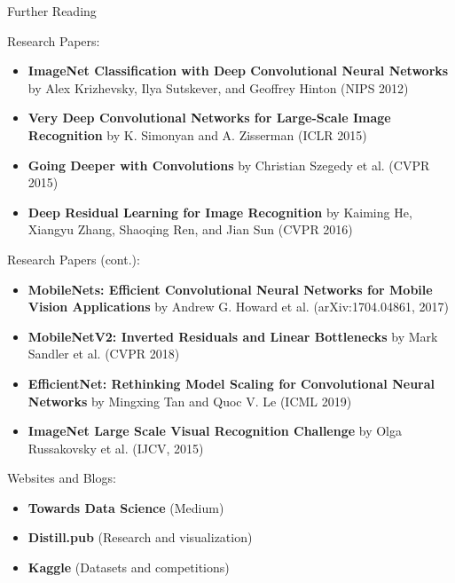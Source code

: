 \begin{frame}{Further Reading}
\begin{block}{Research Papers:}
\begin{itemize}
        \item \textbf{ImageNet Classification with Deep Convolutional Neural Networks} by Alex Krizhevsky, Ilya Sutskever, and Geoffrey Hinton (NIPS 2012) \vspace{0.5em}
        \item \textbf{Very Deep Convolutional Networks for Large-Scale Image Recognition} by K. Simonyan and A. Zisserman (ICLR 2015) \vspace{0.5em}
        \item \textbf{Going Deeper with Convolutions} by Christian Szegedy et al. (CVPR 2015) \vspace{0.5em}
        \item \textbf{Deep Residual Learning for Image Recognition} by Kaiming He, Xiangyu Zhang, Shaoqing Ren, and Jian Sun (CVPR 2016) \vspace{0.5em}
    \end{itemize}
\end{block}
\framebreak
\begin{block}{Research Papers (cont.):}
    \begin{itemize}
        \item \textbf{MobileNets: Efficient Convolutional Neural Networks for Mobile Vision Applications} by Andrew G. Howard et al. (arXiv:1704.04861, 2017) \vspace{0.5em}
        \item \textbf{MobileNetV2: Inverted Residuals and Linear Bottlenecks} by Mark Sandler et al. (CVPR 2018) \vspace{0.5em}
        \item \textbf{EfficientNet: Rethinking Model Scaling for Convolutional Neural Networks} by Mingxing Tan and Quoc V. Le (ICML 2019) \vspace{0.5em}
        \item \textbf{ImageNet Large Scale Visual Recognition Challenge} by Olga Russakovsky et al. (IJCV, 2015) \vspace{0.5em}
    \end{itemize}
\end{block}
\framebreak
\begin{block}{Websites and Blogs:}
    \begin{itemize}
        \item \textbf{Towards Data Science} (Medium)
        \item \textbf{Distill.pub} (Research and visualization)
        \item \textbf{Kaggle} (Datasets and competitions)

\end{itemize}
\end{block}
\end{frame}

